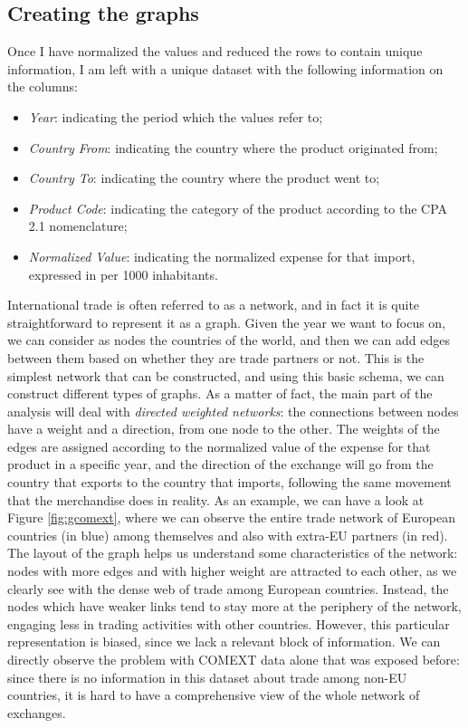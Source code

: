 \subsection{Creating the graphs}\label{sec:ch3graphs}
Once I have normalized the values and reduced the rows to contain unique information, I am left with a unique dataset with the following information on the columns:
\begin{itemize}
    \item \textit{Year}: indicating the period which the values refer to;
    \item \textit{Country From}: indicating the country where the product originated from;
    \item \textit{Country To}: indicating the country where the product went to;
    \item \textit{Product Code}: indicating the category of the product according to the CPA 2.1 nomenclature;
    \item \textit{Normalized Value}: indicating the normalized expense for that import, expressed in \texteuro per 1000 inhabitants.
\end{itemize}
International trade is often referred to as a network, and in fact it is quite straightforward to represent it as a graph. Given the year we want to focus on, we can consider as nodes the countries of the world, and then we can add edges between them based on whether they are trade partners or not. This is the simplest network that can be constructed, and using this basic schema, we can construct different types of graphs. As a matter of fact, the main part of the analysis will deal with \textit{directed weighted networks}: the connections between nodes have a weight and a direction, from one node to the other. The weights of the edges are assigned according to the normalized value of the expense for that product in a specific year, and the direction of the exchange will go from the country that exports to the country that imports, following the same movement that the merchandise does in reality.
As an example, we can have a look at Figure \ref{fig:gcomext}, where we can observe the entire trade network of European countries (in blue) among themselves and also with extra-EU partners (in red). The layout of the graph helps us understand some characteristics of the network: nodes with more edges and with higher weight are attracted to each other, as we clearly see with the dense web of trade among European countries. Instead, the nodes which have weaker links tend to stay more at the periphery of the network, engaging less in trading activities with other countries. However, this particular representation is biased, since we lack a relevant block of information. We can directly observe the problem with COMEXT data alone that was exposed before: since there is no information in this dataset about trade among non-EU countries, it is hard to have a comprehensive view of the whole network of exchanges. 
